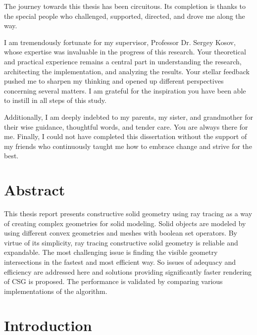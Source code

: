 \documentclass[a4paper,11pt,oneside]{article}
\begin{document}
The journey towards this thesis has been circuitous. Its completion is thanks to the special people who challenged, supported, directed, and drove me along the way.

I am tremendously fortunate for my supervisor, Professor Dr. Sergey Kosov, whose expertise was invaluable in the progress of this research. Your theoretical and practical experience remains a central part in understanding the research, architecting the implementation, and analyzing the results.  Your stellar feedback pushed me to sharpen my thinking and opened up different perspectives concerning several matters. I am grateful for the inspiration you have been able to instill in all steps of this study.

Additionally, I am deeply indebted to my parents, my sister, and grandmother for their wise guidance, thoughtful words, and tender care. You are always there for me. Finally, I could not have completed this dissertation without the support of my friends who continuously taught me how to embrace change and strive for the best.  

\newpage

\section*{Abstract}
  
   
This thesis report presents constructive solid geometry using ray tracing as a way of creating complex geometries for solid modeling. Solid objects are modeled by using different convex geometries and meshes with boolean set operators. By virtue of its simplicity, ray tracing constructive solid geometry is reliable and expandable. The most challenging issue is finding the visible geometry intersections in the fastest and most efficient way. So issues of adequacy and efficiency are addressed here and solutions providing significantly faster rendering of CSG is proposed. The performance is validated by comparing various implementations of the algorithm.   
   
\newpage
\tableofcontents

\clearpage
{}

\section{Introduction}
  
\end{document}
